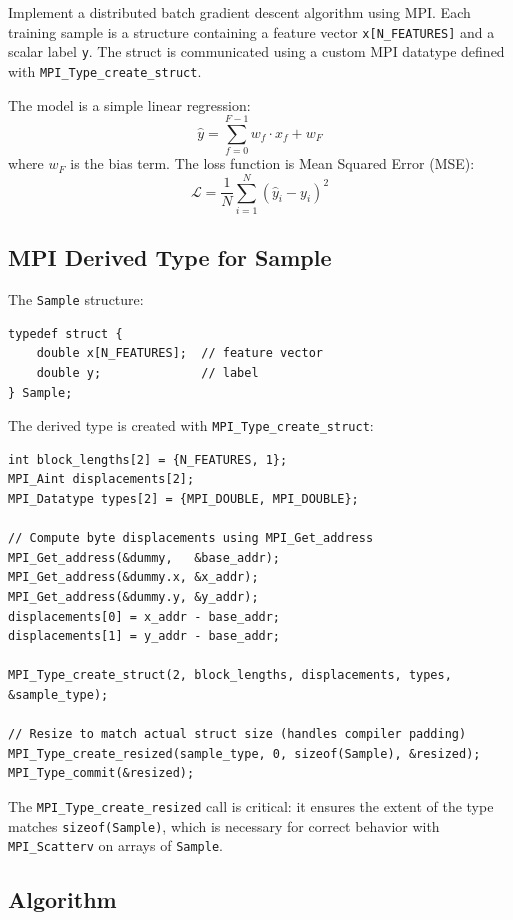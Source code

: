 \documentclass[11pt,a4paper]{article}
\begin{document}
Implement a distributed batch gradient descent algorithm using MPI. Each training sample is a structure containing a feature vector \texttt{x[N\_FEATURES]} and a scalar label \texttt{y}. The struct is communicated using a custom MPI datatype defined with \texttt{MPI\_Type\_create\_struct}.

The model is a simple linear regression:
$$\hat{y} = \sum_{f=0}^{F-1} w_f \cdot x_f + w_F$$
where $w_F$ is the bias term. The loss function is Mean Squared Error (MSE):
$$\mathcal{L} = \frac{1}{N} \sum_{i=1}^{N} (\hat{y}_i - y_i)^2$$

\subsection{MPI Derived Type for Sample}

The \texttt{Sample} structure:
\begin{lstlisting}
typedef struct {
    double x[N_FEATURES];  // feature vector
    double y;              // label
} Sample;
\end{lstlisting}

The derived type is created with \texttt{MPI\_Type\_create\_struct}:

\begin{lstlisting}
int block_lengths[2] = {N_FEATURES, 1};
MPI_Aint displacements[2];
MPI_Datatype types[2] = {MPI_DOUBLE, MPI_DOUBLE};

// Compute byte displacements using MPI_Get_address
MPI_Get_address(&dummy,   &base_addr);
MPI_Get_address(&dummy.x, &x_addr);
MPI_Get_address(&dummy.y, &y_addr);
displacements[0] = x_addr - base_addr;
displacements[1] = y_addr - base_addr;

MPI_Type_create_struct(2, block_lengths, displacements, types, &sample_type);

// Resize to match actual struct size (handles compiler padding)
MPI_Type_create_resized(sample_type, 0, sizeof(Sample), &resized);
MPI_Type_commit(&resized);
\end{lstlisting}

The \texttt{MPI\_Type\_create\_resized} call is critical: it ensures the extent of the type matches \texttt{sizeof(Sample)}, which is necessary for correct behavior with \texttt{MPI\_Scatterv} on arrays of \texttt{Sample}.

\subsection{Algorithm}
\end{document}
